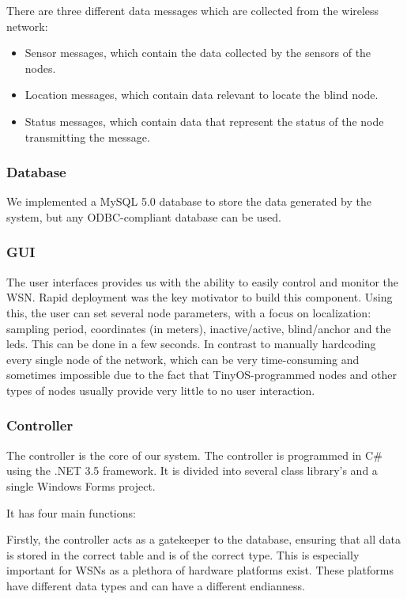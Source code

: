 There are three different data messages which are collected from the wireless network:
\begin{itemize}
	\item	Sensor messages, which contain the data collected by the sensors of the nodes.
	\item Location messages, which contain data relevant to locate the blind node.
	\item Status messages, which contain data that represent the status of the node transmitting the message.
\end{itemize}

\subsubsection{Database}
We implemented a MySQL 5.0 database to store the data generated by the system, but any ODBC-compliant database can be used.  

\subsubsection{GUI}
The user interfaces provides us with the ability to easily control and monitor the WSN. Rapid deployment was the key motivator to build this component. Using this, the user can set several node parameters, with a focus on localization: sampling period, coordinates (in meters), inactive/active, blind/anchor and the leds. This can be done in a few seconds. In contrast to manually hardcoding every single node of the network, which can be very time-consuming and sometimes impossible due to the fact that TinyOS-programmed nodes and other types of nodes usually provide very little to no user interaction. 

\subsubsection{Controller}
The controller is the core of our system. The controller is programmed in C# using the .NET 3.5 framework.  It is divided into several class library's and a single Windows Forms project.

It has four main functions:

Firstly, the controller acts as a gatekeeper to the database, ensuring that all data is stored in the correct table and is of the correct type. This is especially important for WSNs as a plethora of hardware platforms exist. These platforms have different data types and can have a different endianness.


